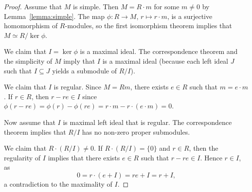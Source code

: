 \begin{proof}
	Assume that $M$ is simple. Then $M=R\cdot m$ for some $m\ne0$ by 
	Lemma~\ref{lemma:simple}. The map $\phi\colon R\to M$, $r\mapsto r\cdot m$, 
	is a surjective homomorphism of $R$-modules, so the first isomorphism theorem implies that 
	$M\simeq R/\ker\phi$. 
	
	We claim that $I=\ker\phi$ is a maximal ideal. The correspondence theorem 
	and the simplicity of $M$ imply that $I$ is a maximal ideal (because each left ideal $J$ such that 
	$I\subseteq J$ yields a submodule of $R/I$).

	We claim that $I$ is regular. Since $M=Rm$, there exists $e\in R$ such that $m=e\cdot m$. If
	$r\in R$, then $r-re\in I$ since 
	$\phi(r-re)=\phi(r)-\phi(re)=r\cdot m-r\cdot (e\cdot m)=0$.

    Now assume that $I$ is maximal left ideal that is regular. The correspondence theorem implies that 
    $R/I$ has no non-zero proper submodules. 
    
    We claim that 
    $R\cdot (R/I)\ne0$. If $R\cdot (R/I)=\{0\}$ and $r\in R$, then 
    the regularity of $I$ implies that 
    there exists $e\in R$ such that $r-re\in I$. Hence $r\in I$, as  
	\[
	0=r\cdot (e+I)=re+I=r+I,
	\]
	a contradiction to the maximality of $I$. 
\end{proof}


